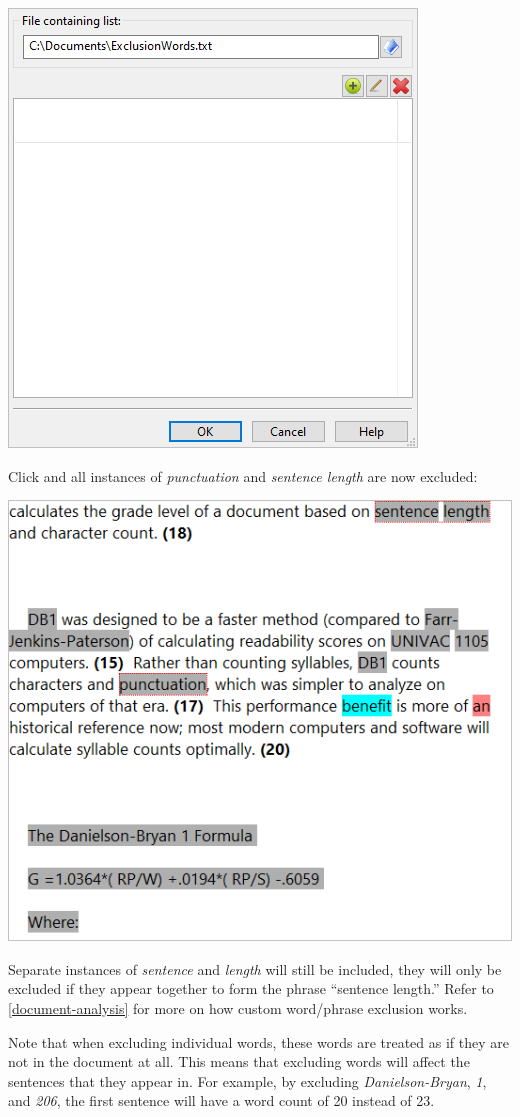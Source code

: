 \documentclass[
]{book}
\theoremstyle{definition}
\theoremstyle{definition}
\theoremstyle{definition}
\theoremstyle{definition}
\theoremstyle{remark}
\begin{document}
\begin{center}\includegraphics[width=0.5\linewidth,]{Images/ExclusionExampleCustomWords} \end{center}

Click  and all instances of \emph{punctuation} and \emph{sentence length} are now excluded:

\begin{center}\includegraphics[width=0.75\linewidth,]{Images/ExclusionExampleCustomWordsExcludedNow} \end{center}

Separate instances of \emph{sentence} and \emph{length} will still be included, they will only be excluded if they appear together to form the phrase ``sentence length.'' Refer to \ref{document-analysis} for more on how custom word/phrase exclusion works.

Note that when excluding individual words, these words are treated as if they are not in the document at all. This means that excluding words will affect the sentences that they appear in. For example, by excluding \emph{Danielson-Bryan}, \emph{1}, and \emph{206}, the first sentence will have a word count of 20 instead of 23.
\end{document}
